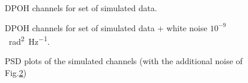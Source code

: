 \documentclass[ fontsize=11pt]{scrartcl} %
\numberwithin{equation}{section} %
\numberwithin{figure}{section} %
\numberwithin{table}{section} %
\begin{document}
\begin{center}
\begin{figure}[hbtp]
\caption{DPOH channels for set of simulated data.}
\label{channels}
\end{figure}
\end{center}

\begin{center}
\begin{figure}[hbtp]
\caption{DPOH channels for set of simulated data + white noise $10^{-9}$ \SI{}{\radian\squared\per\hertz}.}
\label{channels_noise}
\end{figure}
\end{center}


\begin{figure}[hbtp]
\centering
\caption{PSD plots of the simulated channels (with the additional noise of Fig.{\ref{channels_noise}})}
\label{channels_psd}
\end{figure}
\end{document}
